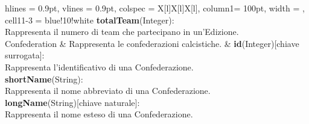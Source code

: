 \begin{tblr}{
    hlines = {0.9pt}, vlines = {0.9pt}, colspec = {X[l]X[l]X[l]}, column{1}= {100pt},
    width = \textwidth, cell{1}{1-3} = {blue!10!white}
}
{		\medskip\textbf{totalTeam}(Integer):\\Rappresenta
			il numero di team che partecipano in un'Edizione.
	}
	\\
	{
		Confederation
	}
	&
	{
	Rappresenta le confederazioni calcistiche.
	}
	& 
	{
		\textbf{id}(Integer)[chiave surrogata]:\\Rappresenta
			l'identificativo di una Confederazione.\\
		\medskip\textbf{shortName}(String):\\Rappresenta
			il nome abbreviato di una Confederazione.\\
		\medskip\textbf{longName}(String)[chiave naturale]:
			\\Rappresenta il nome esteso di una Confederazione.
	}
	\\
\end{tblr}

